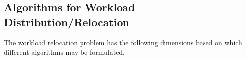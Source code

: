 

\subsection{Algorithms for Workload Distribution/Relocation}
\label{subsec:metrics} The workload relocation problem has the following dimensions based on which different algorithms may be formulated. 

